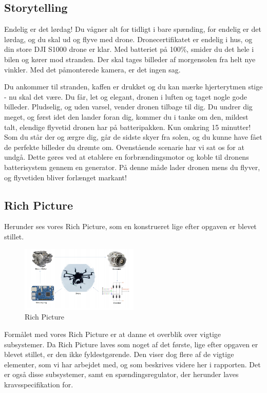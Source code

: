 \subsection{Storytelling}
\label{sec:storytelling-}

Endelig er det lørdag! Du vågner alt for tidligt i bare spænding, for endelig er det lørdag, og du skal ud og flyve med drone. Dronecertifikatet er endelig i hus, og din store DJI S1000 drone er klar. Med batteriet på 100\%, smider du det hele i bilen og kører mod stranden. Der skal tages billeder af morgensolen fra helt nye vinkler. Med det påmonterede kamera, er det ingen sag.

Du ankommer til stranden, kaffen er drukket og du kan mærke hjerterytmen stige - nu skal det være. Du får, let og elegant, dronen i luften og taget nogle gode billeder. Pludselig, og uden varsel, vender dronen tilbage til dig. Du undrer dig meget, og først idet den lander foran dig, kommer du i tanke om den, mildest talt, elendige flyvetid dronen har på batteripakken. Kun omkring 15 minutter! Som du står der og ærgre dig, går de sidste skyer fra solen, og du kunne have fået de perfekte billeder du drømte om. 
Ovenstående scenarie har vi sat os for at undgå. Dette gøres ved at etablere en forbrændingsmotor og koble til dronens batterisystem gennem en generator. På denne måde lader dronen mens du flyver, og flyvetiden bliver forlænget markant!

\subsection{Rich Picture}
\label{sec:rich-picture-}

Herunder ses vores Rich Picture, som en konstrueret lige efter opgaven er blevet stillet.

\begin{figure}[h]
  \centering
  \includegraphics[width=0.5\textwidth]{./figurer/int1.png}
  \caption{Rich Picture}
  \label{fig:int1}
\end{figure}

Formålet med vores Rich Picture er at danne et overblik over vigtige subsystemer. Da Rich Picture laves som noget af det første, lige efter opgaven er blevet stillet, er den ikke fyldestgørende. Den viser dog flere af de vigtige elementer, som vi har arbejdet med, og som beskrives videre her i rapporten. Det er også disse subsystemer, samt en spændingsregulator, der herunder laves kravsspecifikation for.

